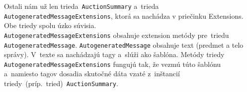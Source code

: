 Ostali nám už len trieda~\verb|AuctionSummary| a~trieda\\\verb|AutogeneratedMessageExtensions|, ktorá sa nachádza v priečinku Extensions. Obe triedy spolu úzko súvisia.\\\verb|AutogeneratedMessageExtensions| obsahuje extension metódy pre~triedu\\\verb|AutogeneratedMessage|. \verb|AutogeneratedMessage| obsahuje text (predmet a telo správy). V~texte sa nachádzajú tagy a~slúži ako šablóna. Metódy triedy\\\verb|AutogeneratedMessageExtensions| fungujú tak, že vezmú túto šablónu a~namiesto tagov dosadia skutočné dáta vzaté z~inštancií\\triedy~(príp.~tried)~\verb|AuctionSummary|.

\fi
